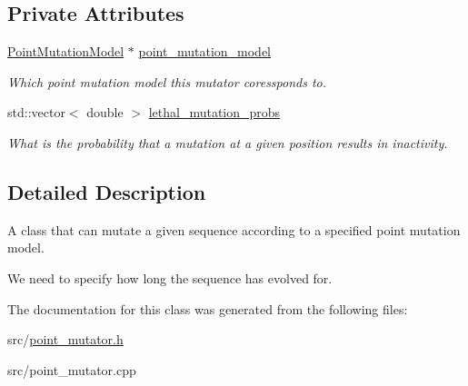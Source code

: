 \subsection*{Private Attributes}
\begin{DoxyCompactItemize}
\item 
\mbox{\label{classretrocombinator_1_1PointMutator_a4a8e94c15e583688d0ab0faa6106d0fb}} 
\hyperlink{classretrocombinator_1_1PointMutationModel}{Point\+Mutation\+Model} $\ast$ \hyperlink{classretrocombinator_1_1PointMutator_a4a8e94c15e583688d0ab0faa6106d0fb}{point\+\_\+mutation\+\_\+model}
\begin{DoxyCompactList}\small\item\em Which point mutation model this mutator coressponds to. \end{DoxyCompactList}\item 
\mbox{\label{classretrocombinator_1_1PointMutator_aa4911d6ec29d8a6b352c2eb698e3ba40}} 
std\+::vector$<$ double $>$ \hyperlink{classretrocombinator_1_1PointMutator_aa4911d6ec29d8a6b352c2eb698e3ba40}{lethal\+\_\+mutation\+\_\+probs}
\begin{DoxyCompactList}\small\item\em What is the probability that a mutation at a given position results in inactivity. \end{DoxyCompactList}\end{DoxyCompactItemize}


\subsection{Detailed Description}
A class that can mutate a given sequence according to a specified point mutation model. 

We need to specify how long the sequence has evolved for. 

The documentation for this class was generated from the following files\+:\begin{DoxyCompactItemize}
\item 
src/\hyperlink{point__mutator_8h}{point\+\_\+mutator.\+h}\item 
src/point\+\_\+mutator.\+cpp\end{DoxyCompactItemize}
